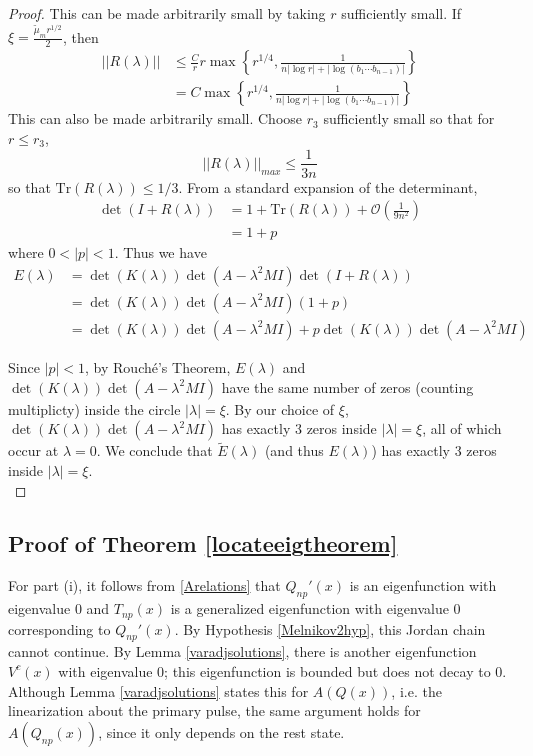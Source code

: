 \documentclass[thesis.tex]{subfiles}
\begin{document}
\begin{lemma}
\begin{proof}
This can be made arbitrarily small by taking $r$ sufficiently small. If $\xi = \frac{\tilde{\mu}_m r^{1/2}}{2}$, then 
\begin{align*}
||R(\lambda)|| &\leq \frac{C}{r} r \max\left\{ r^{1/4}, \frac{1}{n|\log r| + |\log(b_1 \cdots b_{n-1})|} \right\} \\
&= C \max\left\{ r^{1/4}, \frac{1}{n|\log r| + |\log(b_1 \cdots b_{n-1})|} \right\} 
\end{align*}
This can also be made arbitrarily small. Choose $r_3$ sufficiently small so that for $r \leq r_3$,
\[
||R(\lambda)||_{max} \leq \frac{1}{3n}
\] 
so that $\text{Tr}(R(\lambda)) \leq 1/3$. From a standard expansion of the determinant, 
\begin{align*}
\det(I + R(\lambda)) &= 1 + \text{Tr}(R(\lambda)) + \mathcal{O}\left(\frac{1}{9n^2} \right) \\
&= 1 + p
\end{align*}
where $0 < |p| < 1$. Thus we have
\begin{align*}
E(\lambda) &= \det(K(\lambda))\det(A - \lambda^2 MI)\det(I + R(\lambda)) \\
&= \det(K(\lambda))\det(A - \lambda^2 MI)(1 + p) \\
&= \det(K(\lambda))\det(A - \lambda^2 MI) + p \det(K(\lambda))\det(A - \lambda^2 MI)
\end{align*}

Since $|p| < 1$, by Rouch\'e's Theorem, $E(\lambda)$ and $\det(K(\lambda))\det(A - \lambda^2 MI)$ have the same number of zeros (counting multiplicty) inside the circle $|\lambda| = \xi$. By our choice of $\xi$, $\det(K(\lambda))\det(A - \lambda^2 MI)$ has exactly 3 zeros inside $|\lambda| = \xi$, all of which occur at $\lambda = 0$. We conclude that $\tilde{E}(\lambda)$ (and thus $E(\lambda)$) has exactly 3 zeros inside $|\lambda| = \xi$.\\
\end{proof}
\end{lemma}

\subsection{Proof of Theorem \ref{locateeigtheorem}}

For part (i), it follows from \eqref{Arelations} that $Q_{np}'(x)$ is an eigenfunction with eigenvalue 0 and $T_{np}(x)$ is a generalized eigenfunction with eigenvalue 0 corresponding to $Q_{np}'(x)$. By Hypothesis \ref{Melnikov2hyp}, this Jordan chain cannot continue. By Lemma \ref{varadjsolutions}, there is another eigenfunction $V^c(x)$ with eigenvalue 0; this eigenfunction is bounded but does not decay to 0. Although Lemma \ref{varadjsolutions} states this for $A(Q(x))$, i.e. the linearization about the primary pulse, the same argument holds for $A(Q_{np}(x))$, since it only depends on the rest state.
\end{document}

